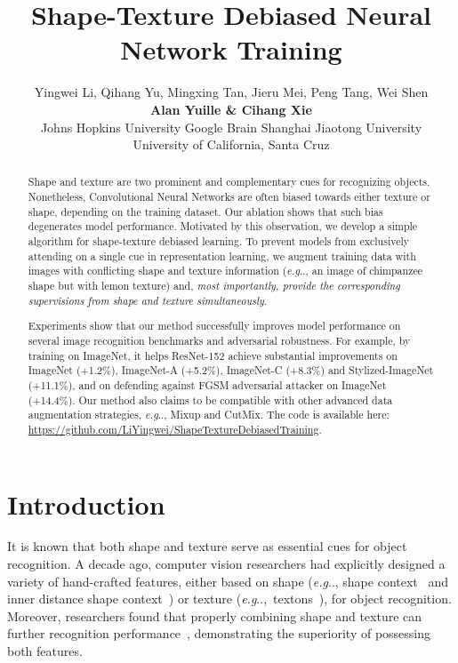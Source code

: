 \documentclass{article} \usepackage{iclr2021_conference,times}
\title{Shape-Texture Debiased Neural Network Training}
\author{Yingwei Li, Qihang Yu, Mingxing Tan, Jieru Mei, Peng Tang, Wei Shen\\
\textbf{Alan Yuille \& Cihang Xie} \vspace{.3em}\\
Johns Hopkins University \quad
Google Brain \quad 
Shanghai Jiaotong University \quad \\
University of California, Santa Cruz \vspace{-0.5em}
}
\makeatletter
\DeclareRobustCommand\onedot{\futurelet\@let@token\@onedot}
\def\@onedot{\ifx\@let@token.\else.\null\fi\xspace}
\def\eg{\emph{e.g}\onedot} \def\Eg{\emph{E.g}\onedot}
\makeatother
\begin{document}
\maketitle

\begin{abstract}
    Shape and texture are two prominent and complementary cues for recognizing objects. 
    Nonetheless, Convolutional Neural Networks are often biased towards either texture or shape, depending on the training dataset.
    Our ablation shows that such bias degenerates model performance. 
    Motivated by this observation, we develop a simple algorithm for shape-texture debiased learning.
    To prevent models from exclusively attending on a single cue in representation learning, we augment training data with images with conflicting shape and texture information (\eg, an image of chimpanzee shape but with lemon texture) and, \emph{most importantly, provide the corresponding supervisions from shape and texture simultaneously}. 
   
    Experiments show that our method successfully improves model performance on several image recognition benchmarks and adversarial robustness. For example, by training on ImageNet, it helps ResNet-152 achieve substantial improvements on ImageNet (+1.2\%), ImageNet-A  (+5.2\%), ImageNet-C (+8.3\%) and Stylized-ImageNet (+11.1\%), and on defending against FGSM adversarial attacker on ImageNet (+14.4\%). Our method also claims to be compatible with other advanced data augmentation strategies, \eg, Mixup and CutMix. The code is available here: \url{https://github.com/LiYingwei/ShapeTextureDebiasedTraining}.
\end{abstract}


\section{Introduction}
It is known that both shape and texture serve as essential cues for object recognition. 
A decade ago, computer vision researchers had explicitly designed a variety of hand-crafted features, either based on shape (\eg, shape context~\citep{belongie2002shape} and inner distance shape context~\citep{ling2007shape}) or texture (\eg,~textons~\citep{MalikBLS01}), for object recognition. 
Moreover, researchers found that properly combining shape and texture can further recognition performance~\citep{shotton2009textonboost,ZhengTY07}, demonstrating the superiority of possessing both features.
\end{document}
